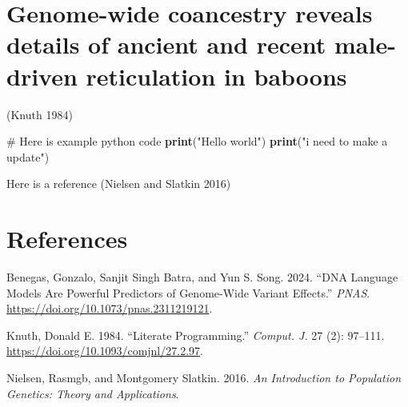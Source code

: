 \documentclass[
  a4paper,
]{scrbook}
\newenvironment{Shaded}{\begin{snugshade}}{\end{snugshade}}
\newcommand{\BuiltInTok}[1]{\textcolor[rgb]{0.39,0.29,0.61}{\textbf{#1}}}
\newcommand{\CommentTok}[1]{\textcolor[rgb]{0.54,0.53,0.53}{#1}}
\newcommand{\NormalTok}[1]{\textcolor[rgb]{0.12,0.11,0.11}{#1}}
\newcommand{\StringTok}[1]{\textcolor[rgb]{0.75,0.01,0.01}{#1}}
\newlength{\cslhangindent}
\newenvironment{CSLReferences}[2] %
 {\begin{list}{}{%
  \setlength{\itemindent}{0pt}
  \setlength{\leftmargin}{0pt}
  \setlength{\parsep}{0pt}
  \ifodd #1
   \setlength{\leftmargin}{\cslhangindent}
   \setlength{\itemindent}{-1\cslhangindent}
  \fi
  \setlength{\itemsep}{#2\baselineskip}}}
 {\end{list}}
\begin{document}
\chapter{Genome-wide coancestry reveals details of ancient and recent
male-driven reticulation in
baboons}\label{genome-wide-coancestry-reveals-details-of-ancient-and-recent-male-driven-reticulation-in-baboons}

(Knuth 1984)

\begin{Shaded}
\begin{Highlighting}[]
\CommentTok{\# Here is example python code}
\BuiltInTok{print}\NormalTok{(}\StringTok{"Hello world"}\NormalTok{)}
\BuiltInTok{print}\NormalTok{(}\StringTok{"i need to make a update"}\NormalTok{)}
\end{Highlighting}
\end{Shaded}

Here is a reference (Nielsen and Slatkin 2016)

\chapter{References}\label{references}

\label{refs}
\begin{CSLReferences}{1}{0}
Benegas, Gonzalo, Sanjit Singh Batra, and Yun S. Song. 2024. {``DNA
Language Models Are Powerful Predictors of Genome-Wide Variant
Effects.''} \emph{PNAS}. \url{https://doi.org/10.1073/pnas.2311219121}.

Knuth, Donald E. 1984. {``Literate Programming.''} \emph{Comput. J.} 27
(2): 97--111. \url{https://doi.org/10.1093/comjnl/27.2.97}.

Nielsen, Rasmgb, and Montgomery Slatkin. 2016. \emph{An Introduction to
Population Genetics: Theory and Applications}.

\end{CSLReferences}


\backmatter
\end{document}

